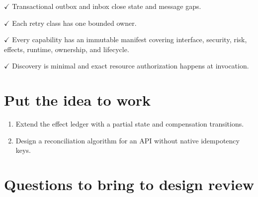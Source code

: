 \textbf{\ensuremath{\checkmark}} Transactional outbox and inbox close state and message gaps.\par

\textbf{\ensuremath{\checkmark}} Each retry class has one bounded owner.\par

\textbf{\ensuremath{\checkmark}} Every capability has an immutable manifest covering interface, security, risk, effects, runtime, ownership, and lifecycle.\par

\textbf{\ensuremath{\checkmark}} Discovery is minimal and exact resource authorization happens at invocation.\par

\section{Put the idea to work}

\begin{enumerate}

\item Extend the effect ledger with a partial state and compensation transitions.

\item Design a reconciliation algorithm for an API without native idempotency keys.

\end{enumerate}

\section{Questions to bring to design review}

